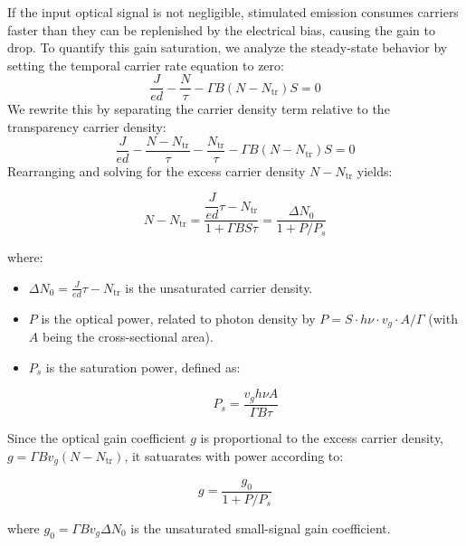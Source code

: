 If the input optical signal is not negligible, stimulated emission consumes carriers faster than they can be replenished by the electrical bias, causing the gain to drop. To quantify this gain saturation, we analyze the steady-state behavior by setting the temporal carrier rate equation to zero:
\begin{equation*}
    \frac{J}{ed} - \frac{N}{\tau} - \Gamma B(N - N_\text{tr})S = 0
\end{equation*}
We rewrite this by separating the carrier density term relative to the transparency carrier density:
\begin{equation*}
    \frac{J}{ed} - \frac{N - N_\text{tr}}{\tau} - \frac{N_\text{tr}}{\tau} - \Gamma B(N - N_\text{tr})S = 0
\end{equation*}
Rearranging and solving for the excess carrier density $N - N_\text{tr}$ yields:
\begin{keyresult}
    \begin{equation}
        N - N_\text{tr} = \frac{\dfrac{J}{ed}\tau - N_\text{tr}}{1 + \Gamma B S \tau} = \frac{\Delta N_0}{1 + P/P_s}
    \end{equation}
\end{keyresult}
where:
\begin{itemize}
    \item $\Delta N_0 = \frac{J}{ed}\tau - N_\text{tr}$ is the unsaturated carrier density.
    \item $P$ is the optical power, related to photon density by $P = S \cdot h\nu \cdot v_g \cdot A / \Gamma$ (with $A$ being the cross-sectional area).
    \item $P_s$ is the saturation power, defined as:
    \begin{keyresult}
        \begin{equation}
            P_s = \frac{v_g h\nu A}{\Gamma B \tau}
        \end{equation}
    \end{keyresult}
\end{itemize}

Since the optical gain coefficient $g$ is proportional to the excess carrier density, $g = \Gamma B v_g(N-N_\text{tr})$, it satuarates with power according to:
\begin{keyresult}
    \begin{equation}
        g = \frac{g_0}{1 + P/P_s}
    \end{equation}
\end{keyresult}
where $g_0 = \Gamma B v_g \Delta N_0$ is the unsaturated small-signal gain coefficient.

